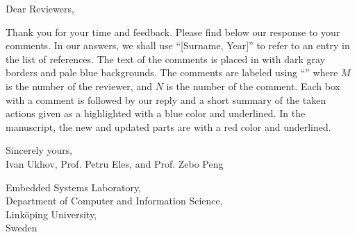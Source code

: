 Dear Reviewers,

\vspace{2.5em}
\noindent Thank you for your time and feedback. Please find below our response
to your comments. In our answers, we shall use ``[Surname, Year]'' to refer to
an entry in the list of references. The text of the comments is placed in
 with dark gray borders and pale blue backgrounds. The
comments are labeled using ``'' where $M$ is the number of the
reviewer, and $N$ is the number of the comment. Each box with a comment is
followed by our reply and a short summary of the taken actions given as a
 highlighted with a blue color and underlined. In the
manuscript, the new and updated parts are  with a red color and
underlined.

\vspace{2.5em}
\noindent Sincerely yours,\\
Ivan Ukhov, Prof. Petru Eles, and Prof. Zebo Peng

\vspace{1em}
\noindent Embedded Systems Laboratory,\\
Department of Computer and Information Science,\\
Link\"{o}ping University,\\
Sweden

$ $
